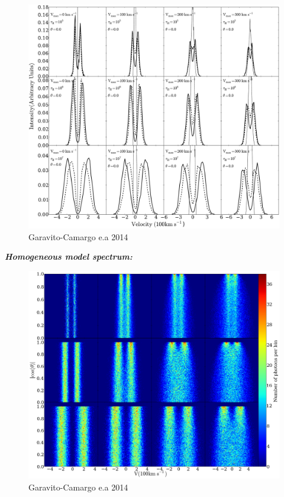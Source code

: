 \documentclass{beamer}
\begin{document}
\begin{frame}
\begin{figure}
\includegraphics[scale=0.2]{Figures/f4-2.pdf}
\caption*{Garavito-Camargo e.a 2014}
\end{figure}
\end{frame}

\begin{frame}{\textbf{\textit{Homogeneous model spectrum:}}}
\begin{figure}
\includegraphics[scale=0.18]{Figures/f3.png}
\caption*{Garavito-Camargo e.a 2014}
\end{figure}
\end{frame}
\end{document}
